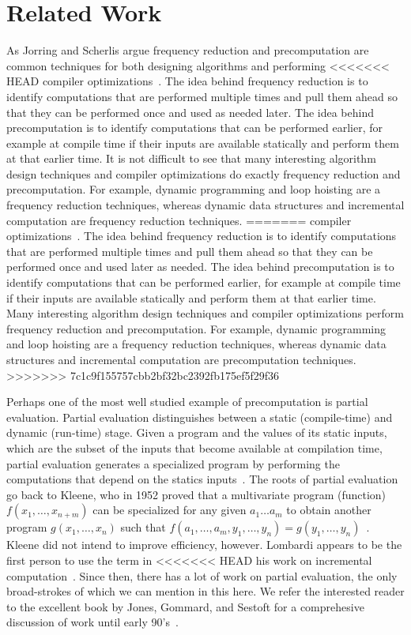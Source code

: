 \section{Related Work}

As Jorring and Scherlis argue frequency reduction and precomputation
are common techniques for both designing algorithms and performing
<<<<<<< HEAD
compiler optimizations~\cite{JS86-staging}.  The idea behind
frequency reduction is to identify computations that are performed
multiple times and pull them ahead so that they can be performed once
and used as needed later.  The idea behind precomputation is to
identify computations that can be performed earlier, for example at
compile time if their inputs are available statically and perform them
at that earlier time. It is not difficult to see that many interesting
algorithm design techniques and compiler optimizations do exactly
frequency reduction and precomputation.  For example, dynamic
programming and loop hoisting are a frequency reduction techniques,
whereas dynamic data structures and incremental computation are
frequency reduction techniques.
=======
compiler optimizations~\cite{JS86-staging}.  The idea behind frequency
reduction is to identify computations that are performed multiple
times and pull them ahead so that they can be performed once and used
later as needed.  The idea behind precomputation is to identify
computations that can be performed earlier, for example at compile
time if their inputs are available statically and perform them at that
earlier time.  Many interesting algorithm design techniques and
compiler optimizations perform frequency reduction and precomputation.
For example, dynamic programming and loop hoisting are a frequency
reduction techniques, whereas dynamic data structures and incremental
computation are precomputation techniques.
>>>>>>> 7c1c9f155757cbb2bf32bc2392fb175ef5f29f36

Perhaps one of the most well studied example of precomputation is
partial evaluation.  Partial evaluation distinguishes between a static
(compile-time) and dynamic (run-time) stage. Given a program and the
values of its static inputs, which are the subset of the inputs that
become available at compilation time, partial evaluation generates a
specialized program by performing the computations that depend on the
statics inputs~\cite{jones96}.  The roots of partial evaluation go
back to Kleene, who in 1952 proved that a multivariate program
(function) $f(x_1, \ldots, x_{n+m})$ can be specialized for any given
$a_1 \ldots a_m$ to obtain another program $g(x_1, \ldots, x_n)$ such
that $f(a_1, \ldots, a_m, y_1, \ldots, y_n) = g(y_1, \ldots,
y_n)$~\cite{Kleene52}.  Kleene did not intend to improve efficiency,
however.  Lombardi appears to be the first person to use the term in
<<<<<<< HEAD
his work on incremental computation~\cite{Lombardi67}.  Since then,
there has a lot of work on partial evaluation, the only broad-strokes
of which we can mention in this here.  We refer the interested reader
to the excellent book by Jones, Gommard, and Sestoft for a
comprehesive discussion of work until early 90's~\cite{JGS93}.

